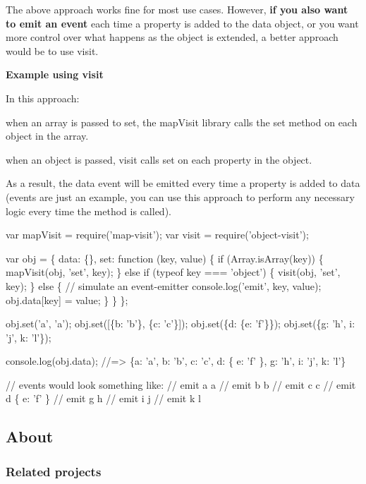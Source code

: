 The above approach works fine for most use cases. However, {\bfseries if you also want to emit an event} each time a property is added to the {\ttfamily data} object, or you want more control over what happens as the object is extended, a better approach would be to use {\ttfamily visit}.

{\bfseries Example using {\ttfamily visit}}

In this approach\+:


\begin{DoxyItemize}
\item when an array is passed to {\ttfamily set}, the {\ttfamily map\+Visit} library calls the {\ttfamily set} method on each object in the array.
\item when an object is passed, {\ttfamily visit} calls {\ttfamily set} on each property in the object.
\end{DoxyItemize}

As a result, the {\ttfamily data} event will be emitted every time a property is added to {\ttfamily data} (events are just an example, you can use this approach to perform any necessary logic every time the method is called).


\begin{DoxyCode}
var mapVisit = require('map-visit');
var visit = require('object-visit');

var obj = \{
  data: \{\},
  set: function (key, value) \{
    if (Array.isArray(key)) \{
      mapVisit(obj, 'set', key);
    \} else if (typeof key === 'object') \{
      visit(obj, 'set', key);
    \} else \{
      // simulate an event-emitter
      console.log('emit', key, value);
      obj.data[key] = value;
    \}
  \}
\};

obj.set('a', 'a');
obj.set([\{b: 'b'\}, \{c: 'c'\}]);
obj.set(\{d: \{e: 'f'\}\});
obj.set(\{g: 'h', i: 'j', k: 'l'\});

console.log(obj.data);
//=> \{a: 'a', b: 'b', c: 'c', d: \{ e: 'f' \}, g: 'h', i: 'j', k: 'l'\}

// events would look something like:
// emit a a
// emit b b
// emit c c
// emit d \{ e: 'f' \}
// emit g h
// emit i j
// emit k l
\end{DoxyCode}


\subsection*{About}

\subsubsection*{Related projects}



